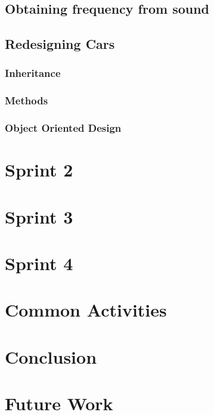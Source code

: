 \section{Obtaining frequency from sound}


\section{Redesigning Cars}
\subsection{Inheritance}

\subsection{Methods}


\subsection{Object Oriented Design}


\chapter{Sprint 2}

\chapter{Sprint 3}

\chapter{Sprint 4}

\chapter{Common Activities}

\chapter{Conclusion}


\chapter{Future Work}

